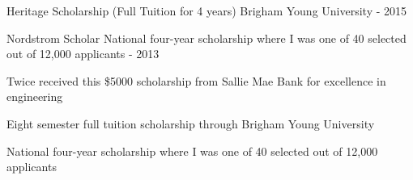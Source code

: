 \begin{cvhonors}
  \cvhonor
    {Heritage Scholarship (Full Tuition for 4 years)} %
    {Brigham Young University} %
    {-} %
    {2015} %
    
  \cvhonor
    {Nordstrom Scholar} %
    {National four-year scholarship where I was one of 40 selected out of 12,000 applicants} %
    {-} %
    {2013} %
    



\end{cvhonors}

\begin{cvparagraph}
Twice received this \$5000 scholarship from Sallie Mae Bank for excellence in engineering
\end{cvparagraph}

\begin{cvparagraph}
Eight semester full tuition scholarship through Brigham Young University
\end{cvparagraph}

\begin{cvparagraph}
National four-year scholarship where I was one of 40 selected out of 12,000 applicants
\end{cvparagraph}

